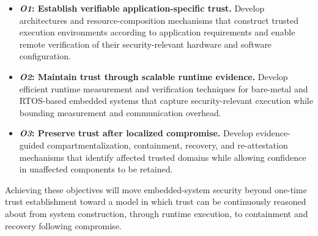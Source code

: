 \begin{itemize}[nosep]
	\item \textbf{\textit{O1}: Establish verifiable application-specific trust.}
	Develop architectures and resource-composition mechanisms that construct trusted execution environments according to application requirements and enable remote verification of their security-relevant hardware and software configuration.
	
	\item \textbf{\textit{O2}: Maintain trust through scalable runtime evidence.}
	Develop efficient runtime measurement and verification techniques for bare-metal and RTOS-based embedded systems that capture security-relevant
	execution while bounding measurement and communication overhead.
	
	\item \textbf{\textit{O3}: Preserve trust after localized compromise.}
	Develop evidence-guided compartmentalization, containment, recovery, and re-attestation mechanisms that identify affected trusted domains while
	allowing confidence in unaffected components to be retained.
\end{itemize}

Achieving these objectives will move embedded-system security beyond one-time trust establishment toward a model in which trust can be continuously reasoned about from system construction, through runtime execution, to
containment and recovery following compromise.


